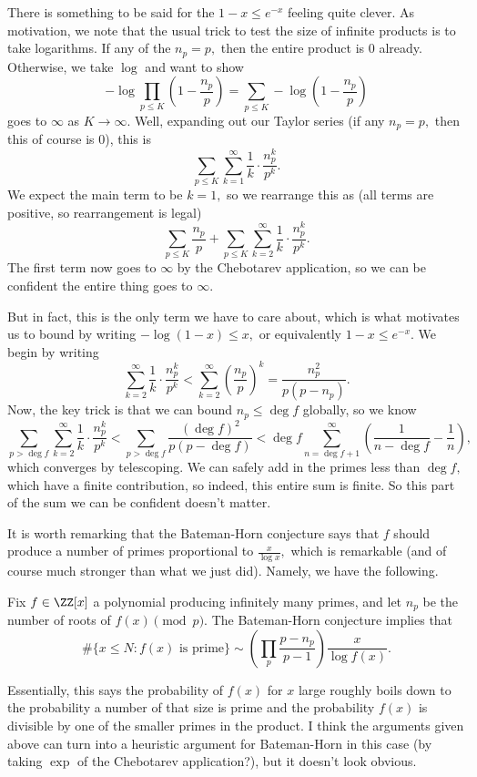 There is something to be said for the $1-x\le e^{-x}$ feeling quite clever. As motivation, we note that the usual trick to test the size of infinite products is to take logarithms. If any of the $n_p=p,$ then the entire product is $0$ already. Otherwise, we take $\log$ and want to show
\[-\log\prod_{p\le K}\left(1-\frac{n_p}p\right)=\sum_{p\le K}-\log\left(1-\frac{n_p}p\right)\]
goes to $\infty$ as $K\to\infty.$ Well, expanding out our Taylor series (if any $n_p=p,$ then this of course is $0$), this is
\[\sum_{p\le K}\sum_{k=1}^\infty\frac1k\cdot\frac{n_p^k}{p^k}.\]
We expect the main term to be $k=1,$ so we rearrange this as (all terms are positive, so rearrangement is legal)
\[\sum_{p\le K}\frac{n_p}p+\sum_{p\le K}\sum_{k=2}^\infty\frac1k\cdot\frac{n_p^k}{p^k}.\]
The first term now goes to $\infty$ by the Chebotarev application, so we can be confident the entire thing goes to $\infty.$

But in fact, this is the only term we have to care about, which is what motivates us to bound by writing $-\log(1-x)\le x,$ or equivalently $1-x\le e^{-x}.$ We begin by writing
\[\sum_{k=2}^\infty\frac1k\cdot\frac{n_p^k}{p^k}<\sum_{k=2}^\infty\left(\frac{n_p}p\right)^k=\frac{n_p^2}{p(p-n_p)}.\]
Now, the key trick is that we can bound $n_p\le\deg f$ globally, so we know
\[\sum_{p>\deg f}\sum_{k=2}^\infty\frac1k\cdot\frac{n_p^k}{p^k}<\sum_{p>\deg f}\frac{(\deg f)^2}{p(p-\deg f)}<\deg f\sum_{n=\deg f+1}^\infty\left(\frac1{n-\deg f}-\frac1n\right),\]
which converges by telescoping. We can safely add in the primes less than $\deg f,$ which have a finite contribution, so indeed, this entire sum is finite. So this part of the sum we can be confident doesn't matter.

It is worth remarking that the Bateman-Horn conjecture says that $f$ should produce a number of primes proportional to $\frac x{\log x},$ which is remarkable (and of course much stronger than what we just did). Namely, we have the following.
\begin{conjecture}
    Fix $f\in\ZZ[x]$ a polynomial producing infinitely many primes, and let $n_p$ be the number of roots of $f(x)\pmod p.$ The Bateman-Horn conjecture implies that
    \[\#\{x\le N:f(x)\text{ is prime}\}\sim\left(\prod_p\frac{p-n_p}{p-1}\right)\frac x{\log f(x)}.\]
\end{conjecture}
Essentially, this says the probability of $f(x)$ for $x$ large roughly boils down to the probability a number of that size is prime and the probability $f(x)$ is divisible by one of the smaller primes in the product. I think the arguments given above can turn into a heuristic argument for Bateman-Horn in this case (by taking $\exp$ of the Chebotarev application?), but it doesn't look obvious.

